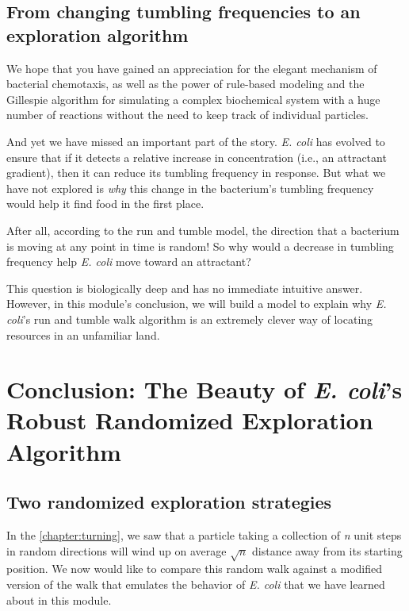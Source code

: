 \FloatBarrier
{}
\subsection{From changing tumbling frequencies to an exploration algorithm}

We hope that you have gained an appreciation for the elegant mechanism of bacterial chemotaxis, as well as the power of rule-based modeling and the Gillespie algorithm for simulating a complex biochemical system with a huge number of reactions without the need to keep track of individual particles.

And yet we have missed an important part of the story. \textit{E. coli} has evolved to ensure that if it detects a relative increase in concentration (i.e., an attractant gradient), then it can reduce its tumbling frequency in response. But what we have not explored is \textit{why} this change in the bacterium's tumbling frequency would help it find food in the first place.

After all, according to the run and tumble model, the direction that a bacterium is moving at any point in time is random! So why would a decrease in tumbling frequency help \textit{E. coli} move toward an attractant?

This question is biologically deep and has no immediate intuitive answer. However, in this module's conclusion, we will build a model to explain why \textit{E. coli}'s run and tumble walk algorithm is an extremely clever way of locating resources in an unfamiliar land.


\FloatBarrier
{}

\section{Conclusion: The Beauty of \textit{E. coli}'s Robust Randomized Exploration Algorithm}
\label{sec:conclusion}

\subsection{Two randomized exploration strategies}


In the \autoref{chapter:turning}, we saw that a particle taking a collection of \textit{n} unit steps in random directions will wind up on average $\sqrt{n}$ distance away from its starting position. We now would like to compare this random walk against a modified version of the walk that emulates the behavior of \textit{E. coli} that we have learned about in this module.

